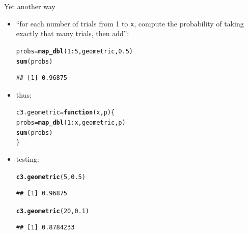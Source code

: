 \documentclass[unknownkeysallowed]{beamer}\usepackage[]{graphicx}\usepackage[]{color}
\makeatletter
\newcommand{\hlnum}[1]{\textcolor[rgb]{0.686,0.059,0.569}{#1}}%
\newcommand{\hlopt}[1]{\textcolor[rgb]{0,0,0}{#1}}%
\newcommand{\hlstd}[1]{\textcolor[rgb]{0.345,0.345,0.345}{#1}}%
\newcommand{\hlkwa}[1]{\textcolor[rgb]{0.161,0.373,0.58}{\textbf{#1}}}%
\newcommand{\hlkwb}[1]{\textcolor[rgb]{0.69,0.353,0.396}{#1}}%
\newcommand{\hlkwc}[1]{\textcolor[rgb]{0.333,0.667,0.333}{#1}}%
\newcommand{\hlkwd}[1]{\textcolor[rgb]{0.737,0.353,0.396}{\textbf{#1}}}%
\newenvironment{kframe}{%
 \def\at@end@of@kframe{}%
 \ifinner\ifhmode%
  \def\at@end@of@kframe{\end{minipage}}%
  \begin{minipage}{\columnwidth}%
 \fi\fi%
 \def\FrameCommand##1{\hskip\@totalleftmargin \hskip-\fboxsep
 \colorbox{shadecolor}{##1}\hskip-\fboxsep
     \hskip-\linewidth \hskip-\@totalleftmargin \hskip\columnwidth}%
 \MakeFramed {\advance\hsize-\width
   \@totalleftmargin\z@ \linewidth\hsize
   \@setminipage}}%
 {\par\unskip\endMakeFramed%
 \at@end@of@kframe}
\newenvironment{knitrout}{}{} %
\makeatother
\begin{document}
\begin{frame}[fragile]{Yet another way}
  
  \begin{itemize}
  \item ``for each number of trials from 1 to \texttt{x}, compute the
    probability of taking exactly that many trials, then add'':
    
\begin{knitrout}
\color{fgcolor}\begin{kframe}
\begin{alltt}
\hlstd{probs}\hlkwb{=}\hlkwd{map_dbl}\hlstd{(}\hlnum{1}\hlopt{:}\hlnum{5}\hlstd{,geometric,}\hlnum{0.5}\hlstd{)}
\hlkwd{sum}\hlstd{(probs)}
\end{alltt}
\begin{verbatim}
## [1] 0.96875
\end{verbatim}
\end{kframe}
\end{knitrout}
\item thus:
  
\begin{knitrout}
\color{fgcolor}\begin{kframe}
\begin{alltt}
\hlstd{c3.geometric}\hlkwb{=}\hlkwa{function}\hlstd{(}\hlkwc{x}\hlstd{,}\hlkwc{p}\hlstd{) \{}
  \hlstd{probs}\hlkwb{=}\hlkwd{map_dbl}\hlstd{(}\hlnum{1}\hlopt{:}\hlstd{x,geometric,p)}
  \hlkwd{sum}\hlstd{(probs)}
\hlstd{\}}
\end{alltt}
\end{kframe}
\end{knitrout}

\item testing:
  
  \begin{multicols}{2}
\begin{knitrout}
\color{fgcolor}\begin{kframe}
\begin{alltt}
\hlkwd{c3.geometric}\hlstd{(}\hlnum{5}\hlstd{,}\hlnum{0.5}\hlstd{)}
\end{alltt}
\begin{verbatim}
## [1] 0.96875
\end{verbatim}
\end{kframe}
\end{knitrout}
\begin{knitrout}
\color{fgcolor}\begin{kframe}
\begin{alltt}
\hlkwd{c3.geometric}\hlstd{(}\hlnum{20}\hlstd{,}\hlnum{0.1}\hlstd{)}
\end{alltt}
\begin{verbatim}
## [1] 0.8784233
\end{verbatim}
\end{kframe}
\end{knitrout}
    

\end{multicols}
\end{itemize}
\end{frame}
\end{document}
